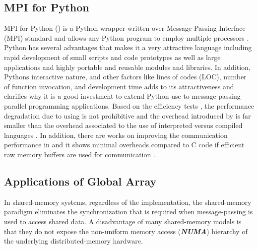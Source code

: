 \label{methods}
\subsection{MPI for Python }
MPI for Python () is a Python wrapper written over Message Passing Interface (MPI) standard and allows any Python program to employ multiple processors \cite{Dalcin:2011aa, Dalcin:2005aa}.
Python has several advantages that makes it a very attractive language including rapid development of small scripts and code prototypes as well as large applications and highly portable and reusable modules and libraries.
In addition, Python\textsc{}s interactive nature, and other factors like lines of codes (LOC), number of function invocation, and development time adds to its attractiveness and clarifies why it is a good investment to extend Python use to message-passing parallel programming applications.
Based on the efficiency tests \cite{Dalcin:2011aa, Dalcin:2005aa}, the performance degradation due to using  is not prohibitive and the overhead introduced by  is far smaller than the overhead associated to the use of interpreted versus compiled languages \cite{GAiN}.
In addition, there are works on improving the communication performance in  and it shows minimal overheads compared to C code if efficient raw memory buffers are used for communication \cite{Dalcin:2011aa}.

\subsection{Applications of Global Array}
In shared-memory systems, regardless of the implementation, the shared-memory paradigm eliminates the synchronization that is required when message-passing is used to access shared data. 
A disadvantage of many shared-memory models is that they do not expose the non-uniform memory access (\textbf{\textit{NUMA}}) hierarchy of the underlying distributed-memory hardware. 

